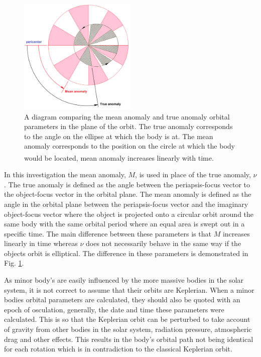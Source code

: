 \documentclass[10pt, twocolumn]{revtex4}    %
\newcommand{\scite}[1]{\textsuperscript{\cite{#1}}}
\begin{document}
\begin{figure}[h!]
\centering
\includegraphics[width=0.5\textwidth]{Mean_anomaly_diagram.png}
\caption{A diagram comparing the mean anomaly and true anomaly orbital parameters in the plane of the orbit. The true anomaly corresponds to the angle on the ellipse at which the body is at. The mean anomaly corresponds to the position on the circle at which the body would be located, mean anomaly increases linearly with time.\scite{Meananomalydiagram2015}}
\label{fig: mean-true anom}
\end{figure}

In this investigation the mean anomaly, $M$, is used in place of the true anomaly, $\nu$. The true anomaly is defined as the angle between the periapsis-focus vector to the object-focus vector in the orbital plane. The mean anomaly is defined as the angle in the orbital plane between the periapsis-focus vector and the imaginary object-focus vector where the object is projected onto a circular orbit around the same body with the same orbital period where an equal area is swept out in a specific time. The main difference between these parameters is that $M$ increases linearly in time whereas $\nu$ does not necessarily behave in the same way if the objects orbit is elliptical. The difference in these parameters is demonstrated in Fig. \ref{fig: mean-true anom}.

As minor body's are easily influenced by the more massive bodies in the solar system, it is not correct to assume that their orbits are Keplerian. When a minor bodies orbital parameters are calculated, they should also be quoted with an epoch of osculation, generally, the date and time these parameters were calculated. This is so that the Keplerian orbit can be perturbed to take account of gravity from other bodies in the solar system, radiation pressure, atmospheric drag and other effects. This results in the body's orbital path not being identical for each rotation which is in contradiction to the classical Keplerian orbit.
\end{document}
